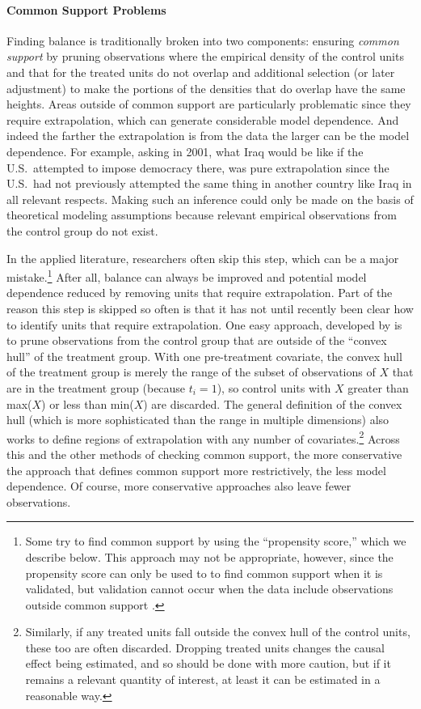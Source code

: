 \documentclass[11pt,titlepage]{article}
\begin{document}
\paragraph{Common Support Problems}

Finding balance is traditionally broken into two components: ensuring
\emph{common support} by pruning observations where the empirical
density of the control units and that for the treated units do not
overlap and additional selection (or later adjustment) to make the
portions of the densities that do overlap have the same heights.
Areas outside of common support are particularly problematic since
they require extrapolation, which can generate considerable model
dependence.  And indeed the farther the extrapolation is from the data
the larger can be the model dependence.  For example, asking in 2001,
what Iraq would be like if the U.S.\ attempted to impose democracy
there, was pure extrapolation since the U.S.\ had not previously
attempted the same thing in another country like Iraq in all relevant
respects.  Making such an inference could only be made on the basis of
theoretical modeling assumptions because relevant empirical
observations from the control group do not exist.

In the applied literature, researchers often skip this step, which can
be a major mistake.\footnote{Some try to find common support by using
  the ``propensity score,'' which we describe below.  This approach
  may not be appropriate, however, since the propensity score can only
  be used to to find common support when it is validated, but
  validation cannot occur when the data include observations outside
  common support \citep[see][and the discussion below]{KinZen06b}.}
After all, balance can always be improved and potential model
dependence reduced by removing units that require extrapolation.  Part
of the reason this step is skipped so often is that it has not until
recently been clear how to identify units that require extrapolation.
One easy approach, developed by \citet{KinZen06b} is to prune
observations from the control group that are outside of the ``convex
hull'' of the treatment group.  With one pre-treatment covariate, the
convex hull of the treatment group is merely the range of the subset
of observations of $X$ that are in the treatment group (because
$t_i=1$), so control units with $X$ greater than max($X$) or less than
min($X$) are discarded.  The general definition of the convex hull
(which is more sophisticated than the range in multiple dimensions)
also works to define regions of extrapolation with any number of
covariates.\footnote{Similarly, if any treated units fall outside the
  convex hull of the control units, these too are often discarded.
  Dropping treated units changes the causal effect being estimated,
  and so should be done with more caution, but if it remains a
  relevant quantity of interest, at least it can be estimated in a
  reasonable way.}  Across this and the other methods of checking
common support, the more conservative the approach that defines common
support more restrictively, the less model dependence.  Of course,
more conservative approaches also leave fewer observations.
\end{document}
